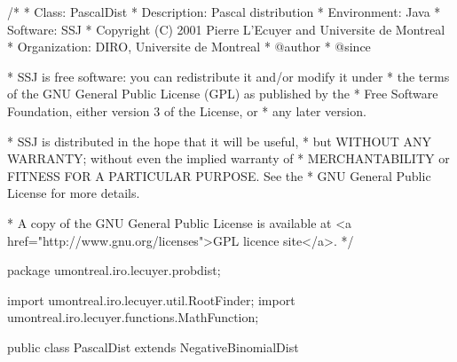 \begin{code}
\begin{hide}
/*
 * Class:        PascalDist
 * Description:  Pascal distribution
 * Environment:  Java
 * Software:     SSJ 
 * Copyright (C) 2001  Pierre L'Ecuyer and Universite de Montreal
 * Organization: DIRO, Universite de Montreal
 * @author       
 * @since

 * SSJ is free software: you can redistribute it and/or modify it under
 * the terms of the GNU General Public License (GPL) as published by the
 * Free Software Foundation, either version 3 of the License, or
 * any later version.

 * SSJ is distributed in the hope that it will be useful,
 * but WITHOUT ANY WARRANTY; without even the implied warranty of
 * MERCHANTABILITY or FITNESS FOR A PARTICULAR PURPOSE.  See the
 * GNU General Public License for more details.

 * A copy of the GNU General Public License is available at
   <a href="http://www.gnu.org/licenses">GPL licence site</a>.
 */
\end{hide}
package umontreal.iro.lecuyer.probdist;
\begin{hide}
import umontreal.iro.lecuyer.util.RootFinder;
import umontreal.iro.lecuyer.functions.MathFunction;
\end{hide}

public class PascalDist extends NegativeBinomialDist\begin{hide} {
   private static final double EPSI = 1.0E-10;

   private static class Function implements MathFunction {
      protected int m;
      protected int max;
      protected double mean;
      protected int[] Fj;

      public Function (int m, int max, double mean, int[] Fj) {
         this.m = m;
         this.max = max;
         this.mean = mean;
         this.Fj = new int[Fj.length];
         System.arraycopy(Fj, 0, this.Fj, 0, Fj.length);
      }

      public double evaluate (double p) {
         double sum = 0.0;
         double s = (p * mean) / (1.0 - p);

         for (int j = 0; j < max; j++)
            sum += Fj[j] / (s + (double) j);

         return sum + m * Math.log (p);
      }

      public double evaluateN (int n, double p) {
         double sum = 0.0;

         for (int j = 0; j < max; j++)
            sum += Fj[j] / (n + j);

         return sum + m * Math.log (p);
      }
   }
\end{hide}
\end{code}

